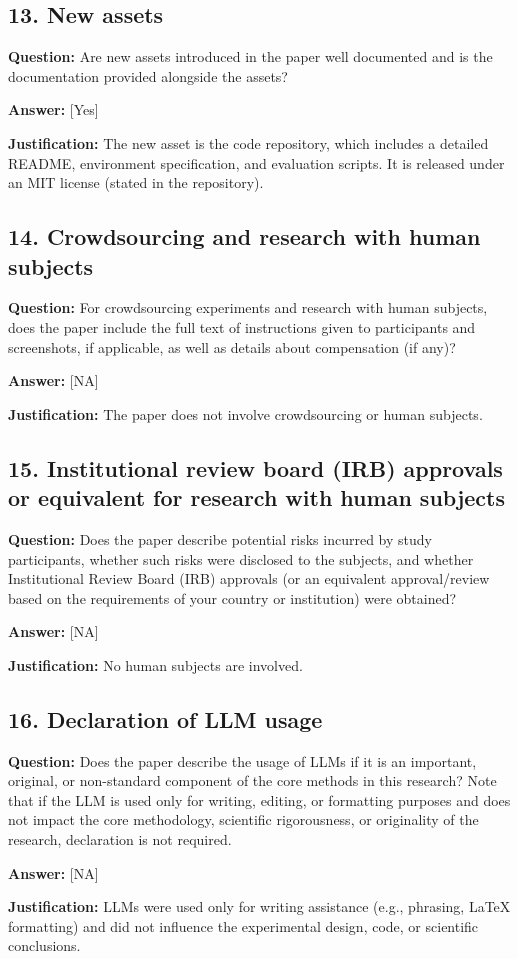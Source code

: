 \documentclass{article}
\begin{document}
\subsection*{13. New assets}

\textbf{Question:} Are new assets introduced in the paper well documented and is the documentation provided alongside the assets?

\textbf{Answer:} [Yes]

\textbf{Justification:} The new asset is the code repository, which includes a detailed README, environment specification, and evaluation scripts. It is released under an MIT license (stated in the repository).

\subsection*{14. Crowdsourcing and research with human subjects}

\textbf{Question:} For crowdsourcing experiments and research with human subjects, does the paper include the full text of instructions given to participants and screenshots, if applicable, as well as details about compensation (if any)?

\textbf{Answer:} [NA]

\textbf{Justification:} The paper does not involve crowdsourcing or human subjects.

\subsection*{15. Institutional review board (IRB) approvals or equivalent for research with human subjects}

\textbf{Question:} Does the paper describe potential risks incurred by study participants, whether such risks were disclosed to the subjects, and whether Institutional Review Board (IRB) approvals (or an equivalent approval/review based on the requirements of your country or institution) were obtained?

\textbf{Answer:} [NA]

\textbf{Justification:} No human subjects are involved.

\subsection*{16. Declaration of LLM usage}

\textbf{Question:} Does the paper describe the usage of LLMs if it is an important, original, or non-standard component of the core methods in this research? Note that if the LLM is used only for writing, editing, or formatting purposes and does not impact the core methodology, scientific rigorousness, or originality of the research, declaration is not required.

\textbf{Answer:} [NA]

\textbf{Justification:} LLMs were used only for writing assistance (e.g., phrasing, LaTeX formatting) and did not influence the experimental design, code, or scientific conclusions.
\end{document}

